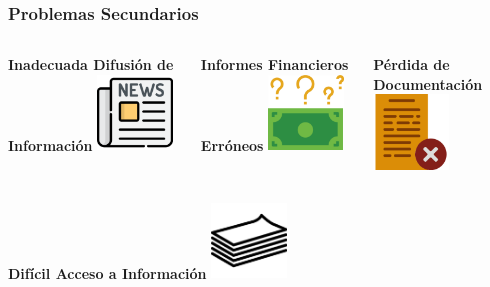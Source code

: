 \documentclass[xcolor=dvipsnames, xcolor=table]{beamer}
\begin{document}
\begin{frame}
    \frametitle{Problemas Secundarios}
    \vspace{5mm}
    \begin{columns}
      \begin{column}{0.3\textwidth}
        \centering\textbf{\textcolor{color3}{\small Inadecuada Difusión de Información}\vspace{3mm}}
        \vspace{10mm}
        \includegraphics[width=20mm]{022-news.pdf}
      \end{column}
      \begin{column}{0.3\textwidth}
        \centering\textbf{\textcolor{color3}{\small Informes Financieros Erróneos}\vspace{3mm}}
        \vspace{10mm}
        \includegraphics[width=20mm]{018-money-1}
      \end{column}
      \begin{column}{0.3\textwidth}
        \centering\textbf{\textcolor{color3}{\small Pérdida de Documentación}\vspace{3mm}}
        \vspace{10mm}
        \includegraphics[width=20mm]{023-document}
      \end{column}
    \end{columns}
    \vspace{-2mm}
    \begin{columns}
      \begin{column}{0.3\textwidth}
        \centering\textbf{\textcolor{color3}{\small Difícil Acceso a Información}\vspace{3mm}}
        \vspace{10mm}
        \includegraphics[width=20mm]{028-paper}

\end{column}
\end{columns}
\end{frame}
\end{document}
